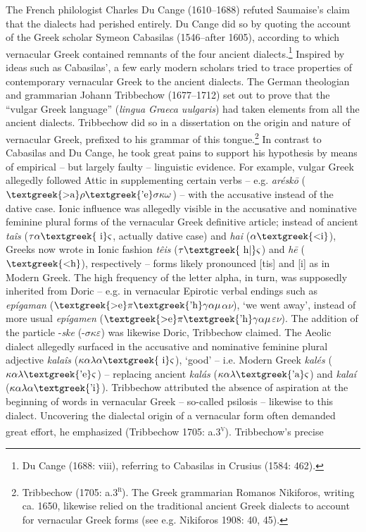 \begin{styleStandard}
The French philologist Charles Du Cange (1610–1688) refuted Saumaise’s claim that the dialects had perished entirely. Du Cange did so by quoting the account of the Greek scholar Symeon Cabasilas (1546–after 1605), according to which vernacular Greek contained remnants of the four ancient dialects.\footnote{ Du Cange (1688: viii), referring to Cabasilas in Crusius (1584: 462).} Inspired by ideas such as Cabasilas’, a few early modern scholars tried to trace properties of contemporary vernacular Greek to the ancient dialects. The German theologian and grammarian Johann Tribbechow (1677–1712) set out to prove that the “vulgar Greek language” (\textit{lingua Graeca uulgaris}) had taken elements from all the ancient dialects. Tribbechow did so in a dissertation on the origin and nature of vernacular Greek, prefixed to his grammar of this tongue.\footnote{ Tribbechow (1705: a.3\textsc{\textsuperscript{r}}). The Greek grammarian Romanos Nikiforos, writing ca. 1650, likewise relied on the traditional ancient Greek dialects to account for vernacular Greek forms (see e.g. Nikiforos 1908: 40, 45).} In contrast to Cabasilas and Du Cange, he took great pains to support his hypothesis by means of empirical – but largely faulty – linguistic evidence. For example, vulgar Greek allegedly followed Attic in supplementing certain verbs – e.g. \textit{arésk\=o }($\text{\textgreek{>a}}\rho \text{\textgreek{'e}}\sigma \kappa \omega $) – with the accusative instead of the dative case. Ionic influence was allegedly visible in the accusative and nominative feminine plural forms of the vernacular Greek definitive article; instead of ancient \textit{taîs} ($\tau \alpha \text{\textgreek{~i}}\varsigma $, actually dative case) and \textit{hai} ($\alpha \text{\textgreek{<i}}$), Greeks now wrote in Ionic fashion \textit{têis} ($\tau \text{\textgreek{~h|}}\varsigma $) and \textit{h\=e} ($\text{\textgreek{<h}}$), respectively – forms likely pronounced [tis] and [i] as in Modern Greek. The high frequency of the letter alpha, in turn, was supposedly inherited from Doric – e.g. in vernacular Epirotic verbal endings such as \textit{epígaman }($\text{\textgreek{>e}}\pi \text{\textgreek{'h}}\gamma \alpha \mu $$\alpha $$\nu $), ‘we went away’, instead of more usual \textit{epígamen} ($\text{\textgreek{>e}}\pi \text{\textgreek{'h}}\gamma \alpha \mu $$\varepsilon $$\nu $). The addition of the particle -\textit{ske} (-$\sigma \kappa \varepsilon $) was likewise Doric, Tribbechow claimed. The Aeolic dialect allegedly surfaced in the accusative and nominative feminine plural adjective \textit{kalaîs} ($\kappa \alpha \lambda \alpha \text{\textgreek{~i}}\varsigma $), ‘good’ – i.e. Modern Greek \textit{kalés }($\kappa \alpha \lambda \text{\textgreek{'e}}\varsigma $) – replacing ancient \textit{kalás} ($\kappa \alpha \lambda \text{\textgreek{'a}}\varsigma $) and \textit{kalaí} ($\kappa \alpha \lambda \alpha \text{\textgreek{'i}}$). Tribbechow attributed the absence of aspiration at the beginning of words in vernacular Greek – so-called psilosis – likewise to this dialect. Uncovering the dialectal origin of a vernacular form often demanded great effort, he emphasized (Tribbechow 1705: a.3\textsc{\textsuperscript{v}}). Tribbechow’s precise 
\end{styleStandard}
